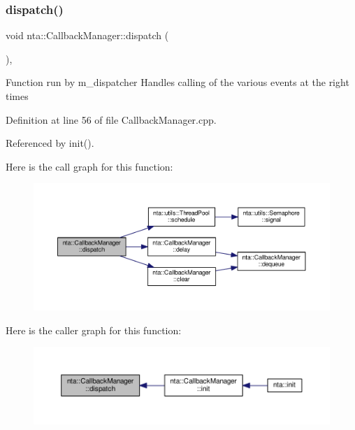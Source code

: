 \subsubsection{\texorpdfstring{dispatch()}{dispatch()}}
{\footnotesize\ttfamily void nta\+::\+Callback\+Manager\+::dispatch (\begin{DoxyParamCaption}{ }\end{DoxyParamCaption})\hspace{0.3cm}{\ttfamily [static]}, {\ttfamily [private]}}

Function run by m\+\_\+dispatcher Handles calling of the various events at the right times 

Definition at line 56 of file Callback\+Manager.\+cpp.



Referenced by init().

Here is the call graph for this function\+:\nopagebreak
\begin{figure}[H]
\begin{center}
\leavevmode
\includegraphics[width=350pt]{d1/de6/classnta_1_1CallbackManager_a7912dc908d7a7a44267ddd8fa6fb8686_cgraph}
\end{center}
\end{figure}
Here is the caller graph for this function\+:\nopagebreak
\begin{figure}[H]
\begin{center}
\leavevmode
\includegraphics[width=350pt]{d1/de6/classnta_1_1CallbackManager_a7912dc908d7a7a44267ddd8fa6fb8686_icgraph}
\end{center}
\end{figure}
\mbox{\label{classnta_1_1CallbackManager_a1fd6132e79e49dbcb787bc8a8507a931}} 
